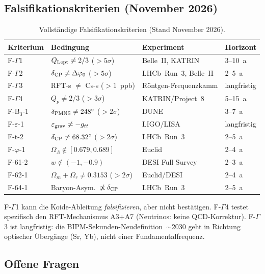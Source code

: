 \documentclass[12pt]{iopart}
\begin{document}
	\subsection{Falsifikationskriterien (November 2026)}
	\label{sec:falsif_nov2026}
	
	\begin{table}[ht]
		\centering\small
		\caption{Vollst\"andige Falsifikationskriterien (Stand November 2026).}
		\begin{tabular}{llll}
			\hline
			\textbf{Kriterium} & \textbf{Bedingung} & \textbf{Experiment} & \textbf{Horizont} \\
			\hline
			F-$\Gamma$1 & $Q_{\rm Lept}\neq2/3$ ($>5\sigma$) & Belle~II, KATRIN & 3--10~a \\
			F-$\Gamma$2 & $\delta_{\rm CP}\neq\Delta\varphi_0$ ($>5\sigma$) & LHCb~Run~3, Belle~II & 2--5~a \\
			F-$\Gamma$3 & RFT-s $\neq$ Cs-s ($>1$~ppb) & R\"ontgen-Frequenzkamm & langfristig \\
			F-$\Gamma$4 & $Q_\nu\neq2/3$ ($>3\sigma$) & KATRIN/Project~8 & 5--15~a \\
			F-B$_3$-1 & $\delta_{\rm PMNS}\neq248^\circ$ ($>2\sigma$) & DUNE & 3--7~a \\
			F-$\varepsilon$-1 & $\varepsilon_{\rm grav}\neq{-}g_{tt}$ & LIGO/LISA & langfristig \\
			F-t-2 & $\delta_{\rm CP}\neq68.32^\circ$ ($>2\sigma$) & LHCb~Run~3 & 2--5~a \\
			F-$\varphi$-1 & $\Omega_\Lambda\notin[0.679,0.689]$ & Euclid & 2--4~a \\
			F-61-2 & $w\notin(-1,-0.9)$ & DESI Full Survey & 2--3~a \\
			F-62-1 & $\Omega_m+\Omega_r\neq0.3153$ ($>2\sigma$) & Euclid/DESI & 2--4~a \\
			F-64-1 & Baryon-Asym.\ $\not\propto\delta_{\rm CP}$ & LHCb~Run~3 & 2--5~a \\
			\hline
		\end{tabular}
	\end{table}
	
	F-$\Gamma$1 kann die Koide-Ableitung \textit{falsifizieren}, aber nicht best\"atigen.
	F-$\Gamma$4 testet spezifisch den RFT-Mechanismus A3+A7 (Neutrinos: keine QCD-Korrektur).
	F-$\Gamma$3 ist langfristig: die BIPM-Sekunden-Neudefinition~$\sim$2030 geht
	in Richtung optischer \"Uberg\"ange (Sr, Yb), nicht einer Fundamentalfrequenz.
	
	\subsection{Offene Fragen}
	
\end{document}
